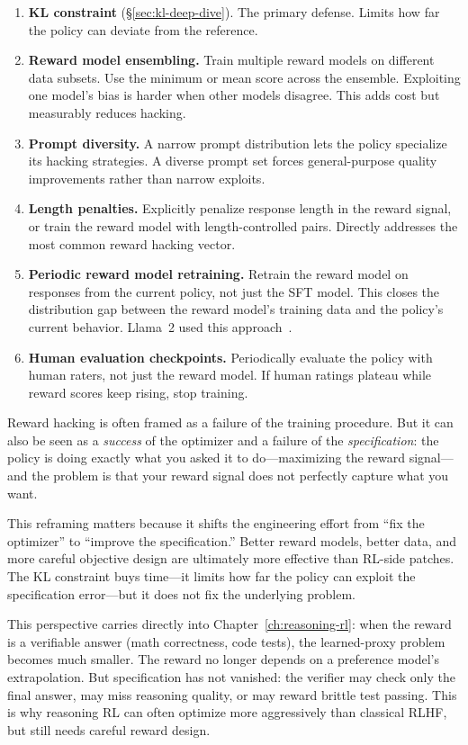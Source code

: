 \begin{enumerate}[nosep]
  \item \textbf{KL constraint} (\S\ref{sec:kl-deep-dive}). The primary defense. Limits how far the policy can deviate from the reference.
  \item \textbf{Reward model ensembling.} Train multiple reward models on different data subsets. Use the minimum or mean score across the ensemble. Exploiting one model's bias is harder when other models disagree. This adds cost but measurably reduces hacking.
  \item \textbf{Prompt diversity.} A narrow prompt distribution lets the policy specialize its hacking strategies. A diverse prompt set forces general-purpose quality improvements rather than narrow exploits.
  \item \textbf{Length penalties.} Explicitly penalize response length in the reward signal, or train the reward model with length-controlled pairs. Directly addresses the most common reward hacking vector.
  \item \textbf{Periodic reward model retraining.} Retrain the reward model on responses from the current policy, not just the SFT model. This closes the distribution gap between the reward model's training data and the policy's current behavior. Llama~2 used this approach~\cite{touvron2023llama2}.
  \item \textbf{Human evaluation checkpoints.} Periodically evaluate the policy with human raters, not just the reward model. If human ratings plateau while reward scores keep rising, stop training.
\end{enumerate}

\begin{tcolorbox}[colback=blue!5, colframe=blue!40, title=\textbf{Is Reward Hacking a Bug or a Feature?}]
Reward hacking is often framed as a failure of the training procedure. But it can also be seen as a \emph{success} of the optimizer and a failure of the \emph{specification}: the policy is doing exactly what you asked it to do---maximizing the reward signal---and the problem is that your reward signal does not perfectly capture what you want.

This reframing matters because it shifts the engineering effort from ``fix the optimizer'' to ``improve the specification.'' Better reward models, better data, and more careful objective design are ultimately more effective than RL-side patches. The KL constraint buys time---it limits how far the policy can exploit the specification error---but it does not fix the underlying problem.

This perspective carries directly into Chapter~\ref{ch:reasoning-rl}: when the reward is a verifiable answer (math correctness, code tests), the learned-proxy problem becomes much smaller. The reward no longer depends on a preference model's extrapolation. But specification has not vanished: the verifier may check only the final answer, may miss reasoning quality, or may reward brittle test passing. This is why reasoning RL can often optimize more aggressively than classical RLHF, but still needs careful reward design.
\end{tcolorbox}

